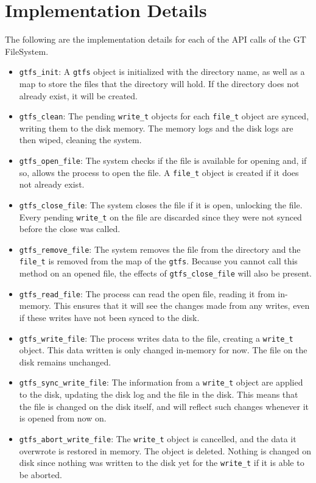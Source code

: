 \documentclass{article}
\begin{document}
\section*{Implementation Details}
The following are the implementation details for each of the API calls of the GT FileSystem.
\begin{itemize}
    \item \texttt{gtfs\_init}: A \texttt{gtfs} object is initialized with the directory name, as well as a map to store the files that the directory will hold. If the directory does not already exist, it will be created.
    \item \texttt{gtfs\_clean}: The pending \texttt{write\_t} objects for each \texttt{file\_t} object are synced, writing them to the disk memory. The memory logs and the disk logs are then wiped, cleaning the system.
    \item \texttt{gtfs\_open\_file}: The system checks if the file is available for opening and, if so, allows the process to open the file. A \texttt{file\_t} object is created if it does not already exist. 
    \item \texttt{gtfs\_close\_file}: The system closes the file if it is open, unlocking the file. Every pending \texttt{write\_t} on the file are discarded since they were not synced before the close was called.
    \item \texttt{gtfs\_remove\_file}: The system removes the file from the directory and the \texttt{file\_t} is removed from the map of the \texttt{gtfs}. Because you cannot call this method on an opened file, the effects of \texttt{gtfs\_close\_file} will also be present.
    \item \texttt{gtfs\_read\_file}: The process can read the open file, reading it from in-memory. This ensures that it will see the changes made from any writes, even if these writes have not been synced to the disk.
    \item \texttt{gtfs\_write\_file}: The process writes data to the file, creating a \texttt{write\_t} object. This data written is only changed in-memory for now. The file on the disk remains unchanged. 
    \item \texttt{gtfs\_sync\_write\_file}: The information from a \texttt{write\_t} object are applied to the disk, updating the disk log and the file in the disk. This means that the file is changed on the disk itself, and will reflect such changes whenever it is opened from now on. 
    \item \texttt{gtfs\_abort\_write\_file}: The \texttt{write\_t} object is cancelled, and the data it overwrote is restored in memory. The object is deleted. Nothing is changed on disk since nothing was written to the disk yet for the \texttt{write\_t} if it is able to be aborted.

\end{itemize}
\end{document}
